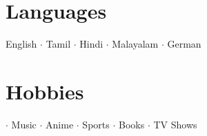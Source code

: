 \documentclass[letterpaper,12pt]{article}
\begin{document}
\section{Languages}
English $\cdot$ Tamil $\cdot$ Hindi $\cdot$ Malayalam  $\cdot$ German

\section{Hobbies}
 $\cdot$ Music $\cdot$ Anime $\cdot$ Sports $\cdot$ Books $\cdot$ TV Shows

\end{document}
